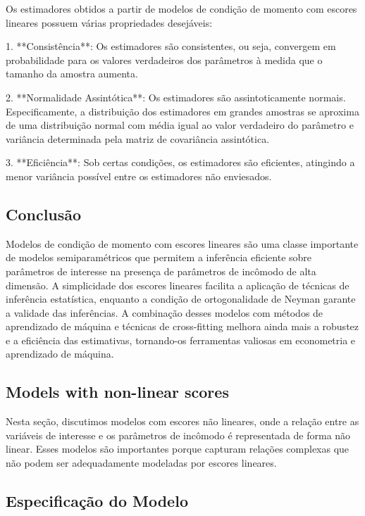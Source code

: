 \documentclass[a4paper,12pt]{article}[abntex2]
\begin{document}
Os estimadores obtidos a partir de modelos de condição de momento com escores lineares possuem várias propriedades desejáveis:

1. **Consistência**: Os estimadores são consistentes, ou seja, convergem em probabilidade para os valores verdadeiros dos parâmetros à medida que o tamanho da amostra aumenta.

2. **Normalidade Assintótica**: Os estimadores são assintoticamente normais. Especificamente, a distribuição dos estimadores em grandes amostras se aproxima de uma distribuição normal com média igual ao valor verdadeiro do parâmetro e variância determinada pela matriz de covariância assintótica.

3. **Eficiência**: Sob certas condições, os estimadores são eficientes, atingindo a menor variância possível entre os estimadores não enviesados.

\subsection*{Conclusão}

Modelos de condição de momento com escores lineares são uma classe importante de modelos semiparamétricos que permitem a inferência eficiente sobre parâmetros de interesse na presença de parâmetros de incômodo de alta dimensão. A simplicidade dos escores lineares facilita a aplicação de técnicas de inferência estatística, enquanto a condição de ortogonalidade de Neyman garante a validade das inferências. A combinação desses modelos com métodos de aprendizado de máquina e técnicas de cross-fitting melhora ainda mais a robustez e a eficiência das estimativas, tornando-os ferramentas valiosas em econometria e aprendizado de máquina.

\subsection{Models  with non-linear  scores}

Nesta seção, discutimos modelos com escores não lineares, onde a relação entre as variáveis de interesse e os parâmetros de incômodo é representada de forma não linear. Esses modelos são importantes porque capturam relações complexas que não podem ser adequadamente modeladas por escores lineares.

\subsection*{Especificação do Modelo}
\end{document}
